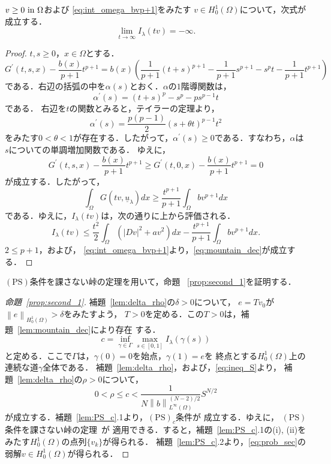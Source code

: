 \begin{lem} \label{lem:mountain_dec}
 $v \geq 0 ~\text{in}~ \Omega$および
 \eqref{eq:int_omega_bvp+1}をみたす
 $v \in H_0^1(\Omega)$について，次式が成立する．
 \begin{equation}
  \lim_{t \to \infty} I_\lambda(tv) =  -\infty. \label{eq:mountain_dec}
 \end{equation}
\end{lem}

\begin{proof}
 $t, s \geq 0$，$x \in \Omega$とする．
 \[
  G^\prime(t, s, x) - \frac{b(x)}{p+1} t^{p+1} = b(x) \left(
 \frac{1}{p+1}(t+s)^{p+1} - \frac{1}{p+1} s^{p+1} - s^p t -
 \frac{1}{p+1} t^{p+1} \right)
 \]
 である．右辺の括弧の中を$\alpha(s)$とおく．$\alpha$の$1$階導関数は，
 \[
  \alpha^\prime(s) = (t+s)^p - s^p - p s^{p-1} t
 \]
 である．
 右辺を$t$の関数とみると，テイラーの定理より，
 \[
  \alpha^\prime(s) = \frac{p(p-1)}{2}(s+ \theta t)^{p-1} t^2
 \]
 をみたす$0 < \theta < 1$が存在する．したがって，$\alpha^\prime(s)
 \geq 0$である．すなわち，$\alpha$は$s$についての単調増加関数である．
 ゆえに，
 \[
 G^\prime(t, s, x) - \frac{b(x)}{p+1} t^{p+1} \geq 
 G^\prime(t, 0, x) - \frac{b(x)}{p+1} t^{p+1} = 0
 \]
 が成立する．したがって，
 \[
  \int_\Omega G(tv, \underline{u}_\lambda) dx \geq
 \frac{t^{p+1}}{p+1} \int_\Omega b v^{p+1} dx
 \]
 である．ゆえに，$I_\lambda(tv)$は，次の通りに上から評価される．
 \[
  I_\lambda(tv) \leq \frac{t^2}{2} \int_\Omega \left( \lvert Dv
 \rvert^2 + av^2 \right) dx - \frac{t^{p+1}}{p+1} \int_\Omega bv^{p+1} dx.
 \]
 $2 \leq p+1$，および，
 \eqref{eq:int_omega_bvp+1}より，\eqref{eq:mountain_dec}が成立する．\qedhere
\end{proof}

$(\mathrm{PS})$条件を課さない峠の定理を用いて，命題
~\ref{prop:second_1}を証明する．

\begin{proof}[命題~\ref{prop:second_1}]
 補題~\ref{lem:delta_rho}の$\delta > 0$について，
 $e = Tv_0$が$\left\| e \right\|_{H_0^1(\Omega)} > \delta$をみたすよう，
 $T > 0$を定める．この$T > 0$は，補題~\ref{lem:mountain_dec}により存在
 する．
 \[
   c = \inf_{\gamma \in \Gamma} \max_{s \in [0, 1]} I_\lambda ( \gamma
 (s ))
 \]
 と定める．ここで$\Gamma$は，$\gamma(0) = 0$を始点，$\gamma(1) = e$を
 終点とする$H_0^1(\Omega)$上の連続な道$\gamma$全体である．
 補題~\ref{lem:delta_rho}，および，\eqref{eq:ineq_S}より，
 補題~\ref{lem:delta_rho}の$\rho > 0$について，
 \[
  0 < \rho \leq c <    \frac{1}{N\left\| b
             \right\|_{L^\infty(\Omega)} ^{(N-2)/2}} S^{N/2} 
 \]
 が成立する．補題~\ref{lem:PS_c}.1より，$(\mathrm{PS})_c$条件が
 成立する．ゆえに，
 $(\mathrm{PS})$条件を課さない峠の定理~\cite{MR0370183}が
 適用できる．すると，補題~\ref{lem:PS_c}.1の(i), (ii)を
 みたす$H_0^1(\Omega)$の点列$\{ v_k \}$が得られる．
 補題~\ref{lem:PS_c}.2より，\ref{eq:prob_sec}の弱解$v \in
 H_0^1(\Omega)$が得られる．\qedhere
\end{proof}

